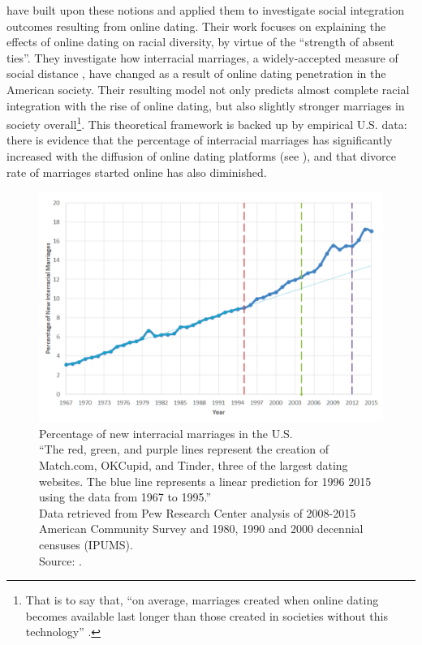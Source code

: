 \citet{Ortega2017The-Strength-of} have built upon these notions and
applied them to investigate social integration outcomes resulting
from online dating. Their work focuses on explaining the effects
of online dating on racial diversity, by virtue of the \textquotedblleft strength
of absent ties\textquotedblright . They investigate how interracial
marriages, a widely-accepted measure of social distance \citep{Qian2002Race-and-social,Wong2003Why-Do-Only-5.5},
have changed as a result of online dating penetration in the American
society. Their resulting model not only predicts almost complete racial
integration with the rise of online dating, but also slightly stronger
marriages in society overall\footnote{That is to say that, \textquotedblleft on average, marriages created
when online dating becomes available last longer than those created
in societies without this technology\textquotedblright{} \citep{Ortega2017The-Strength-of}.}. This theoretical framework is backed up by empirical U.S. data:
there is evidence that the percentage of interracial marriages has
significantly increased with the diffusion of online dating platforms
(see ), and that divorce rate
of marriages started online has also diminished. 
\begin{figure}[h]
\includegraphics[width=1\columnwidth]{assets/US-interracial-marriages}

\caption{Percentage of new interracial marriages in the U.S.\label{fig:Percentage-of-interr}\protect \\
{\footnotesize{}\textquotedblleft The red, green, and purple lines
represent the creation of Match.com, OKCupid, and Tinder, three of
the largest dating websites. The blue line represents a linear prediction
for 1996 \textendash{} 2015 using the data from 1967 to 1995.\textquotedblright }\protect \\
{\footnotesize{}Data retrieved from Pew Research Center analysis of
2008-2015 American Community Survey and 1980, 1990 and 2000 decennial
censuses (IPUMS).}\protect \\
{\footnotesize{}Source: \citet{Ortega2017The-Strength-of}.}}
\end{figure}
